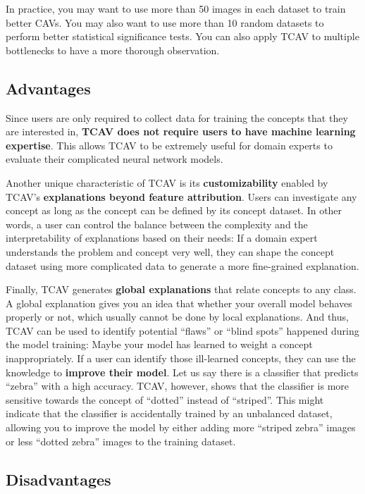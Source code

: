\documentclass[
  10pt,
]{scrbook}
\begin{document}
In practice, you may want to use more than 50 images in each dataset to train better CAVs.
You may also want to use more than 10 random datasets to perform better statistical significance tests.
You can also apply TCAV to multiple bottlenecks to have a more thorough observation.

\hypertarget{advantages-20}{%
\subsection{Advantages}\label{advantages-20}}

Since users are only required to collect data for training the concepts that they are interested in, \textbf{TCAV does not require users to have machine learning expertise}.
This allows TCAV to be extremely useful for domain experts to evaluate their complicated neural network models.

Another unique characteristic of TCAV is its \textbf{customizability} enabled by TCAV's \textbf{explanations beyond feature attribution}.
Users can investigate any concept as long as the concept can be defined by its concept dataset.
In other words, a user can control the balance between the complexity and the interpretability of explanations based on their needs: If a domain expert understands the problem and concept very well, they can shape the concept dataset using more complicated data to generate a more fine-grained explanation.

Finally, TCAV generates \textbf{global explanations} that relate concepts to any class.
A global explanation gives you an idea that whether your overall model behaves properly or not, which usually cannot be done by local explanations.
And thus, TCAV can be used to identify potential ``flaws'' or ``blind spots'' happened during the model training: Maybe your model has learned to weight a concept inappropriately.
If a user can identify those ill-learned concepts, they can use the knowledge to \textbf{improve their model}.
Let us say there is a classifier that predicts ``zebra'' with a high accuracy. TCAV, however, shows that the classifier is more sensitive towards the concept of ``dotted'' instead of ``striped''.
This might indicate that the classifier is accidentally trained by an unbalanced dataset, allowing you to improve the model by either adding more ``striped zebra'' images or less ``dotted zebra'' images to the training dataset.

\hypertarget{disadvantages-20}{%
\subsection{Disadvantages}\label{disadvantages-20}}
\end{document}
